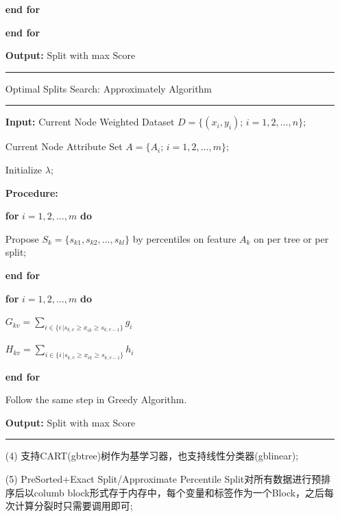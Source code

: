 \documentclass[a4paper]{article}
\begin{document}
\begin{itemize}
					\hspace*{48pt}  \textbf{end for}\par
					\hspace*{32pt}  \textbf{end for}\par
					\textbf{Output:} Split with max Score\\
			\noindent\rule[0.10\baselineskip]{\textwidth}{0.5pt}\par
			Optimal Splits Search: Approximately Algorithm\\
			\noindent\rule[0.10\baselineskip]{\textwidth}{0.5pt}
					\textbf{Input:} Current Node Weighted Dataset $D=\{(x_i,y_i);\, i = 1,2,\dots, n\};$\par
					\hspace*{32pt} Current Node Attribute Set $A = \{A_i;\,i=1,2,\dots,m\}$;\par
					\hspace*{32pt} Initialize $\lambda$;\par
					\textbf{Procedure:}\par
					\hspace*{32pt} \textbf{for} $i = 1,2,\dots, m$ \textbf{do}\par
					\hspace*{48pt}	Propose $S_k = \{s_{k1},s_{k2},\dots,s_{kl}\}$ by percentiles on feature $A_k$ on per tree or per split;\par
					\hspace*{32pt} \textbf{end for}\par
					\hspace*{32pt}	\textbf{for} $i = 1,2,\dots, m$ \textbf{do}\par
					\hspace*{48pt}	$G_{kv} = \sum_{i \in \{i\,|s_{k,v}\geq x_{ik}\geq s_{k,v-1}\}}g_i$\par
					\hspace*{48pt}  $H_{kv} = \sum_{i \in \{i\,|s_{k,v}\geq x_{ik}\geq s_{k,v-1}\}}h_i$\par
					\hspace*{32pt}  \textbf{end for}\par
					\hspace*{32pt}  Follow the same step in Greedy Algorithm.\par  
					\textbf{Output:} Split with max Score\\
			\noindent\rule[0.10\baselineskip]{\textwidth}{0.75pt}\par
			\item[(4)] 支持CART(gbtree)树作为基学习器，也支持线性分类器(gblinear);
			\item[(5)] PreSorted+Exact Split\slash Approximate Percentile Split对所有数据进行预排序后以columb block形式存于内存中，每个变量和标签作为一个Block，之后每次计算分裂时只需要调用即可;
		\end{itemize}
\end{document}
